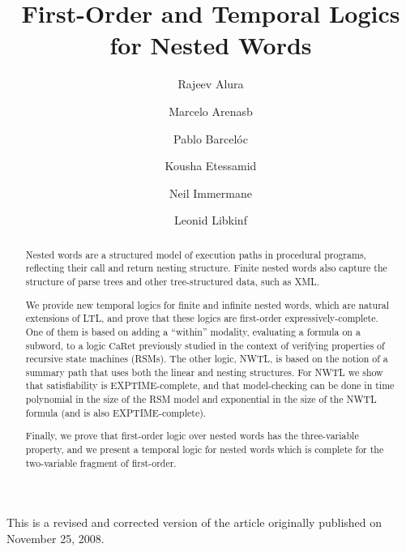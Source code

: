 \documentclass{LMCS}
\theoremstyle{plain}
\theoremstyle{definition}
\newcommand{\caret}{\text{CaRet}}
\begin{document}
\title[First-Order and Temporal Logics for Nested Words]{First-Order and Temporal Logics for Nested Words}


\author[R.~Alur]{Rajeev Alur\rsuper a}
\address{{\lsuper a}Department of Computer and Information Science, University of Pennsylvania}

\author[M.~Arenas]{Marcelo Arenas\rsuper b}
\address{{\lsuper b}Department of Computer Science, Pontificia Universidad Cat\'olica de Chile}

\author[P.~Barcel\'o]{Pablo Barcel\'o\rsuper c}
\address{{\lsuper c}Department of Computer Science, Universidad de Chile}

\author[K.~Etessami]{Kousha Etessami\rsuper d}
\address{{\lsuper d}School of Informatics, University of Edinburgh, Edinburgh}

\author[N.~Immerman]{Neil Immerman\rsuper e}
\address{{\lsuper e}Department of Computer Science,University of Massachusetts}

\author[L.~Libkin]{Leonid Libkin\rsuper f}
\address{{\lsuper f}School of Informatics, University of Edinburgh, Edinburgh}


\begin{revision}
  This is a revised and corrected version of the article originally
  published on November 25, 2008.
\end{revision}

\begin{abstract}
Nested words are a structured model of execution paths in procedural
programs, reflecting their call and return nesting structure.  Finite
nested words also capture the structure of parse trees and other
tree-structured data, such as XML.

We provide new temporal logics for finite and infinite nested words,
which are natural extensions of LTL, and prove that these logics are
first-order expressively-complete.  One of them is based on adding a
``within'' modality, evaluating a formula on a subword, to a logic $\caret$
previously studied in the context of verifying properties of recursive
state machines (RSMs). The other logic, NWTL, 
is based on the notion of a summary
path that uses both the linear and nesting structures. For NWTL
we show that satisfiability is EXPTIME-complete, and that
model-checking can be done in time
polynomial in the size of the RSM model and exponential in the size of
the NWTL formula (and is also 
EXPTIME-complete).

Finally, we prove that first-order logic over nested words has the
three-variable property, and we present a temporal logic for nested
words which is complete for the two-variable fragment of first-order.
\end{abstract}
\end{document}
